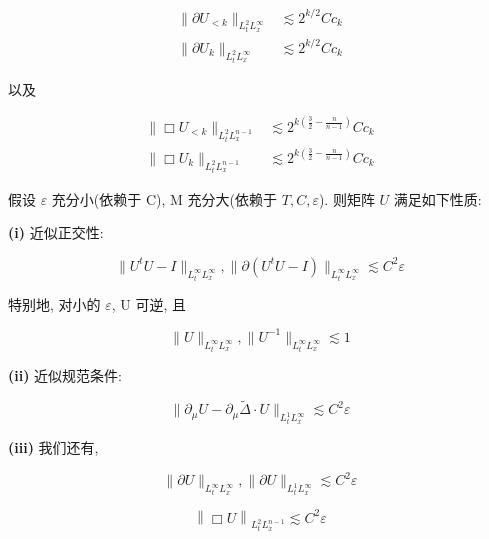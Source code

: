 \begin{equation}
\begin{aligned}
\| \partial U _ {< k} \| _ {L _ {t} ^ {2} L _ {x} ^ {\infty}} &\lesssim 2 ^ {k / 2} C c _ {k} \\
\| \partial U _ {k} \| _ {L _ {t} ^ {2} L _ {x} ^ {\infty}} &\lesssim 2 ^ {k / 2} C c _ {k}
\end{aligned}\label{eq:cG-55}
\end{equation}

以及

\begin{equation}
\begin{aligned}
\| \Box U _ {< k} \| _ {L _ {t} ^ {2} L _ {x} ^ {n - 1}} &\lesssim 2 ^ {k (\frac {3}{2} - \frac {n}{n - 1})} C c _ {k} \\
\| \Box U _ {k} \| _ {L _ {t} ^ {2} L _ {x} ^ {n - 1}} &\lesssim 2 ^ {k (\frac {3}{2} - \frac {n}{n - 1})} C c _ {k}
\end{aligned}\label{eq:cG-56}
\end{equation}

\begin{proposition}\label{prop:cG-2.28}
假设 $\varepsilon$ 充分小(依赖于 C), M 充分大(依赖于 $T,  C,  \varepsilon$). 则矩阵 $U$ 满足如下性质:

\textbf{(i)} 近似正交性:

\begin{equation}
\| U ^ {t} U - I \| _ {L _ {t} ^ {\infty} L _ {x} ^ {\infty}},  \| \partial (U ^ {t} U - I) \| _ {L _ {t} ^ {\infty} L _ {x} ^ {\infty}} \lesssim C ^ {2} \varepsilon\label{eq:cG-57}
\end{equation}

特别地, 对小的 $\varepsilon$, U 可逆, 且

\begin{equation}
\| U \| _ {L _ {t} ^ {\infty} L _ {x} ^ {\infty}},  \| U ^ {- 1} \| _ {L _ {t} ^ {\infty} L _ {x} ^ {\infty}} \lesssim 1\label{eq:cG-58}
\end{equation}

\textbf{(ii)} 近似规范条件:

\begin{equation}
\| \partial_ {\mu} U - \partial_ {\mu} \tilde {\Delta} \cdot U \| _ {L _ {t} ^ {1} L _ {x} ^ {\infty}} \lesssim C ^ {2} \varepsilon\label{eq:cG-59}
\end{equation}

\textbf{(iii)} 我们还有, 

\begin{equation}
\| \partial U \| _ {L _ {t} ^ {\infty} L _ {x} ^ {\infty}},  \| \partial U \| _ {L _ {t} ^ {1} L _ {x} ^ {\infty}} \lesssim C ^ {2} \varepsilon\label{eq:cG-60}
\end{equation}

\begin{equation}
\left\| \Box U \right\| _ {L _ {t} ^ {2} L _ {x} ^ {n - 1}} \lesssim C ^ {2} \varepsilon\label{eq:cG-61}
\end{equation}
\end{proposition}


